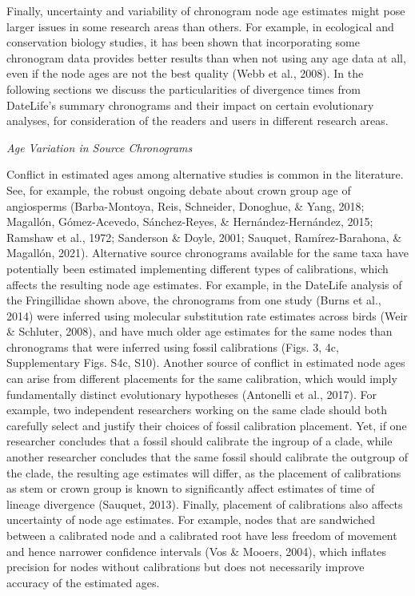 \documentclass[english,man]{apa6}
\begin{document}
Finally, uncertainty and variability of chronogram node age estimates might pose larger issues in some research areas than others. For example, in ecological and conservation biology studies, it has been shown that incorporating some chronogram data provides better results than when not using any age data at all, even if the node ages are not the best quality (Webb et al., 2008). In the following sections we discuss the particularities of divergence times from DateLife's summary chronograms and their impact on certain evolutionary analyses, for consideration of the readers and users in different research areas.

\begin{center}
\emph{Age Variation in Source Chronograms}
\end{center}

Conflict in estimated ages among alternative studies is common in the literature. See, for example, the robust ongoing debate about crown group age of angiosperms (Barba-Montoya, Reis, Schneider, Donoghue, \& Yang, 2018; Magallón, Gómez-Acevedo, Sánchez-Reyes, \& Hernández-Hernández, 2015; Ramshaw et al., 1972; Sanderson \& Doyle, 2001; Sauquet, Ramírez-Barahona, \& Magallón, 2021).
Alternative source chronograms available for the same taxa have potentially been estimated implementing different types of calibrations, which affects the resulting node age estimates.
For example, in the DateLife analysis of the Fringillidae shown above, the chronograms from one study (Burns et al., 2014) were inferred using molecular substitution rate estimates across birds (Weir \& Schluter, 2008), and have much older age estimates for the same nodes than chronograms that were inferred using fossil calibrations (Figs. 3, 4c, Supplementary Figs. S4c, S10).
Another source of conflict in estimated node ages can arise from different placements for the same calibration, which would imply fundamentally distinct evolutionary hypotheses (Antonelli et al., 2017).
For example, two independent researchers working on the same clade should both carefully select and justify their choices of fossil calibration placement.
Yet, if one researcher concludes that a fossil should calibrate the ingroup of a clade, while another researcher concludes that the same fossil should calibrate the outgroup of the clade, the resulting age estimates will differ, as the placement of calibrations as stem or crown group is known to significantly affect estimates of time of lineage divergence (Sauquet, 2013).
Finally, placement of calibrations also affects uncertainty of node age estimates. For example, nodes that are sandwiched between a calibrated node and a calibrated root have less freedom of movement and hence narrower confidence intervals (Vos \& Mooers, 2004), which inflates precision for nodes without calibrations but does not necessarily improve accuracy of the estimated ages.
\end{document}
